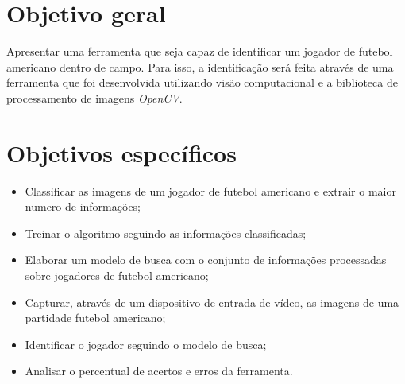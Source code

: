 \section{\textbf{{Objetivo geral}}}
\label{objetivo-geral}
Apresentar uma ferramenta que seja capaz de identificar um jogador de futebol americano dentro de campo. Para isso, a identificação será feita através de uma ferramenta que foi desenvolvida utilizando visão computacional e a biblioteca de processamento de imagens \textit{OpenCV}. 


\section{\textbf{{Objetivos específicos}}}
 \begin{itemize}
\item Classificar as imagens de um jogador de futebol americano e extrair o maior numero de informações;

\item Treinar o algoritmo seguindo as informações classificadas;

\item Elaborar um modelo de busca com o conjunto de informações processadas sobre jogadores de futebol americano;
   
\item Capturar, através de um dispositivo de entrada de vídeo, as imagens de uma partidade futebol americano;
   
\item Identificar o jogador seguindo o modelo de busca;
   
\item Analisar o percentual de acertos e erros da ferramenta.
   
 \end{itemize}